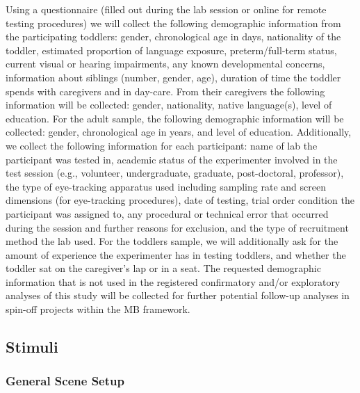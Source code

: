 \documentclass[
  english,
  man, donotrepeattitle,floatsintext]{apa6}
\begin{document}
Using a questionnaire (filled out during the lab session or online for remote testing procedures) we will collect the following demographic information from the participating toddlers: gender, chronological age in days, nationality of the toddler, estimated proportion of language exposure, preterm/full-term status, current visual or hearing impairments, any known developmental concerns, information about siblings (number, gender, age), duration of time the toddler spends with caregivers and in day-care. From their caregivers the following information will be collected: gender, nationality, native language(s), level of education. For the adult sample, the following demographic information will be collected: gender, chronological age in years, and level of education.
Additionally, we collect the following information for each participant: name of lab the participant was tested in, academic status of the experimenter involved in the test session (e.g., volunteer, undergraduate, graduate, post-doctoral, professor), the type of eye-tracking apparatus used including sampling rate and screen dimensions (for eye-tracking procedures), date of testing, trial order condition the participant was assigned to, any procedural or technical error that occurred during the session and further reasons for exclusion, and the type of recruitment method the lab used. For the toddlers sample, we will additionally ask for the amount of experience the experimenter has in testing toddlers, and whether the toddler sat on the caregiver's lap or in a seat. The requested demographic information that is not used in the registered confirmatory and/or exploratory analyses of this study will be collected for further potential follow-up analyses in spin-off projects within the MB framework.

\hypertarget{stimuli}{%
\subsection{Stimuli}\label{stimuli}}

\hypertarget{general-scene-setup}{%
\subsubsection{General Scene Setup}\label{general-scene-setup}}
\end{document}
